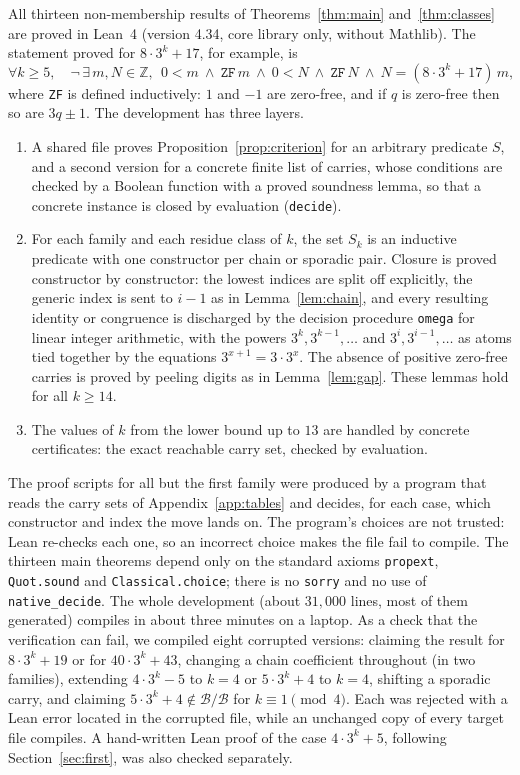 \documentclass[11pt]{amsart}
\theoremstyle{definition}
\newcommand{\B}{\mathcal{B}}
\newcommand{\Z}{\mathbb{Z}}
\begin{document}
All thirteen non-membership results of Theorems~\ref{thm:main} and~\ref{thm:classes} are proved in Lean~4 \cite{Lean4} (version 4.34, core library
only, without Mathlib). The statement proved for $8\cdot 3^k+17$, for example, is
\[
\forall k\ge 5,\quad \neg\,\exists\, m,N\in\Z,\ \ 0<m\ \wedge\ \mathtt{ZF}\,m\ \wedge\ 0<N\ \wedge\
\mathtt{ZF}\,N\ \wedge\ N=(8\cdot 3^k+17)\,m,
\]
where \texttt{ZF} is defined inductively: $1$ and $-1$ are zero-free, and if $q$ is zero-free then so
are $3q\pm1$. The development has three layers.
\begin{enumerate}
\item A shared file proves Proposition~\ref{prop:criterion} for an arbitrary predicate $S$, and a
second version for a concrete finite list of carries, whose conditions are checked by a Boolean
function with a proved soundness lemma, so that a concrete instance is closed by evaluation
(\texttt{decide}).
\item For each family and each residue class of $k$, the set $S_k$ is an inductive predicate with one
constructor per chain or sporadic pair. Closure is proved constructor by constructor: the lowest
indices are split off explicitly, the generic index is sent to $i-1$ as in Lemma~\ref{lem:chain},
and every resulting identity or congruence is discharged by the decision procedure \texttt{omega}
for linear integer arithmetic, with the powers $3^k,3^{k-1},\dots$ and $3^i,3^{i-1},\dots$ as
atoms tied together by the equations $3^{x+1}=3\cdot 3^x$. The absence of positive zero-free
carries is proved by peeling digits as in Lemma~\ref{lem:gap}. These lemmas hold for all $k\ge 14$.
\item The values of $k$ from the lower bound up to $13$ are handled by concrete certificates: the
exact reachable carry set, checked by evaluation.
\end{enumerate}
The proof scripts for all but the first family were produced by a program that reads the carry sets
of Appendix~\ref{app:tables} and decides, for each case, which constructor and index the move lands
on. The program's choices are not trusted: Lean re-checks each one, so an incorrect choice makes the
file fail to compile. The thirteen main theorems depend only on the standard axioms \texttt{propext},
\texttt{Quot.sound} and \texttt{Classical.choice}; there is no \texttt{sorry} and no use of
\texttt{native\_decide}. The whole development (about $31{,}000$ lines, most of them generated)
compiles in about three minutes on a laptop. As a check that the verification can fail, we compiled
eight corrupted versions: claiming the result for $8\cdot 3^k+19$ or for $40\cdot 3^k+43$, changing a
chain coefficient throughout (in two families), extending $4\cdot 3^k-5$ to $k=4$ or $5\cdot 3^k+4$ to
$k=4$, shifting a sporadic carry, and claiming $5\cdot 3^k+4\notin\B/\B$ for $k\equiv 1\pmod 4$. Each
was rejected with a Lean error located in the corrupted file, while an unchanged copy of every target file compiles. A hand-written Lean proof of the case $4\cdot 3^k+5$, following
Section~\ref{sec:first}, was also checked separately.
\end{document}
